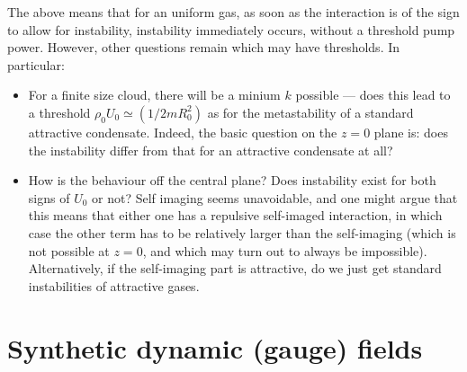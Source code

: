 \documentclass[twocolumn]{revtex4-1}
\begin{document}
The above means that for an uniform gas, as soon as the interaction
is of the sign to allow for instability, instability immediately occurs,
without a threshold pump power.  However, other questions remain
which may have thresholds.  In particular:
\begin{itemize}
\item For a finite size cloud, there will be a minium $k$ possible ---
  does this lead to a threshold $\rho_0 U_0 \simeq (1/2m R_0^2)$ as
  for the metastability of a standard attractive condensate.  Indeed,
  the basic question on the $z=0$ plane is: does the instability differ
  from that for an attractive condensate at all?
\item How is the behaviour off the central plane?  Does instability
  exist for both signs of $U_0$ or not?  Self imaging seems
  unavoidable, and one might argue that this means that either one has
  a repulsive self-imaged interaction, in which case the other term
  has to be relatively larger than the self-imaging (which is not
  possible at $z=0$, and which may turn out to always be impossible).
  Alternatively, if the self-imaging part is attractive, do we just
  get standard instabilities of attractive gases.
\end{itemize}



\section{Synthetic dynamic (gauge) fields}
\label{sec:synth-gauge-fields}
\end{document}
